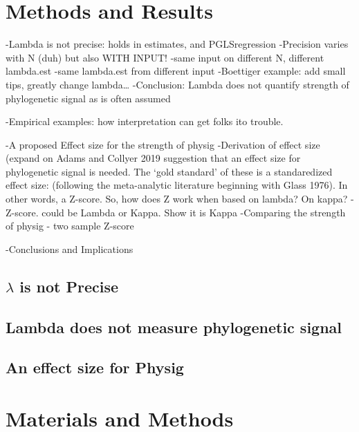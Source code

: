 \documentclass[
]{article}
\begin{document}
\hypertarget{methods-and-results}{%
\section{Methods and Results}\label{methods-and-results}}

-Lambda is not precise: holds in estimates, and PGLSregression
-Precision varies with N (duh) but also WITH INPUT! -same input on
different N, different lambda.est -same lambda.est from different input
-Boettiger example: add small tips, greatly change lambda\ldots{}
-Conclusion: Lambda does not quantify strength of phylogenetic signal as
is often assumed

-Empirical examples: how interpretation can get folks ito trouble.

-A proposed Effect size for the strength of physig -Derivation of effect
size (expand on Adams and Collyer 2019 suggestion that an effect size
for phylogenetic signal is needed. The `gold standard' of these is a
standaredized effect size: (following the meta-analytic literature
beginning with Glass 1976). In other words, a Z-score. So, how does Z
work when based on lambda? On kappa? - Z-score. could be Lambda or
Kappa. Show it is Kappa -Comparing the strength of physig - two sample
Z-score

-Conclusions and Implications

\hypertarget{lambda-is-not-precise}{%
\subsection{\texorpdfstring{\(\lambda\) is not
Precise}{\textbackslash lambda is not Precise}}\label{lambda-is-not-precise}}

\hypertarget{lambda-does-not-measure-phylogenetic-signal}{%
\subsection{Lambda does not measure phylogenetic
signal}\label{lambda-does-not-measure-phylogenetic-signal}}

\hypertarget{an-effect-size-for-physig}{%
\subsection{An effect size for Physig}\label{an-effect-size-for-physig}}

\hypertarget{materials-and-methods}{%
\section{Materials and Methods}\label{materials-and-methods}}
\end{document}

